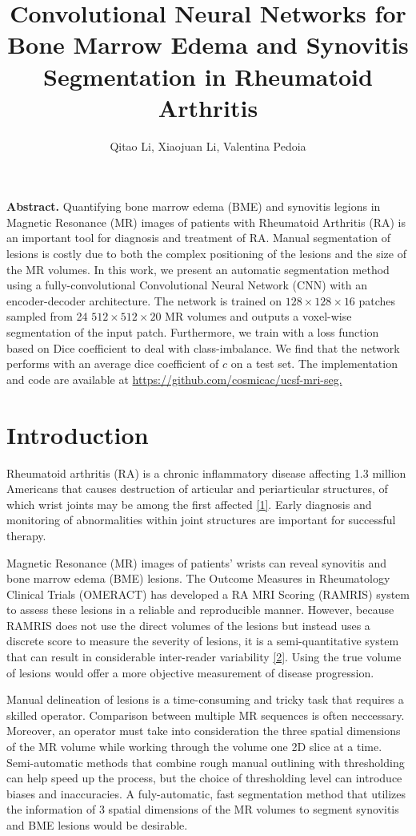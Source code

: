 \documentclass[11pt]{article}
\title{\textbf{Convolutional Neural Networks for Bone Marrow Edema and Synovitis Segmentation in Rheumatoid Arthritis}}
\date{}
\author{Qitao Li, Xiaojuan Li, Valentina Pedoia}
\begin{document}
\maketitle

\noindent \textbf{Abstract.} Quantifying bone marrow edema (BME) and synovitis legions in Magnetic Resonance (MR) images of patients with Rheumatoid Arthritis (RA) is an important tool for diagnosis and treatment of RA. Manual segmentation of lesions is costly due to both the complex positioning of the lesions and the size of the MR volumes. In this work, we present an automatic segmentation method using a fully-convolutional Convolutional Neural Network (CNN) with an encoder-decoder architecture. The network is trained on $ 128 \times 128 \times 16$ patches sampled from 24 $512 \times 512 \times 20$ MR volumes and outputs a voxel-wise segmentation of the input patch. Furthermore, we train with a loss function based on Dice coefficient to deal with class-imbalance. We find that the network performs with an average dice coefficient of $c$ on a test set. The implementation and code are available at \url{https://github.com/cosmicac/ucsf-mri-seg.} 

\section{Introduction}

Rheumatoid arthritis (RA) is a chronic inflammatory disease affecting 1.3 million Americans that causes destruction of articular and periarticular structures, of which wrist joints may be among the first affected \hyperref[gab]{[1]}. Early diagnosis and monitoring of abnormalities within joint structures are important for successful therapy.

Magnetic Resonance (MR) images of patients' wrists can reveal synovitis and bone marrow edema (BME) lesions. The Outcome Measures in Rheumatology Clinical Trials (OMERACT) has developed a RA MRI Scoring (RAMRIS) system to assess these lesions in a reliable and reproducible manner. However, because RAMRIS does not use the direct volumes of the lesions but instead uses a discrete score to measure the severity of lesions, it is a semi-quantitative system that can result in considerable inter-reader variability \hyperref[hodge]{[2]}. Using the true volume of lesions would offer a more objective measurement of disease progression. 

Manual delineation of lesions is a time-consuming and tricky task that requires a skilled operator. Comparison between multiple MR sequences is often neccessary. Moreover, an operator must take into consideration the three spatial dimensions of the MR volume while working through the volume one 2D slice at a time. Semi-automatic methods that combine rough manual outlining with thresholding can help speed up the process, but the choice of thresholding level can introduce biases and inaccuracies. A fuly-automatic, fast segmentation method that utilizes the information of 3 spatial dimensions of the MR volumes to segment synovitis and BME lesions would be desirable.
\end{document}
